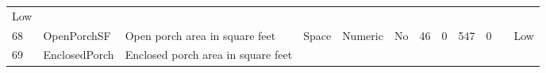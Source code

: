 \documentclass[11pt]{article}
\begin{document}
\begin{longtable}[]{@{}llllllllllll@{}}
\begin{minipage}[t]{0.04\columnwidth}
Low\strut
\end{minipage}\tabularnewline
\begin{minipage}[t]{0.04\columnwidth}\raggedright\strut
68\strut
\end{minipage} & \begin{minipage}[t]{0.04\columnwidth}\raggedright\strut
OpenPorchSF\strut
\end{minipage} & \begin{minipage}[t]{0.04\columnwidth}\raggedright\strut
Open porch area in square feet\strut
\end{minipage} & \begin{minipage}[t]{0.04\columnwidth}\raggedright\strut
Space\strut
\end{minipage} & \begin{minipage}[t]{0.04\columnwidth}\raggedright\strut
Numeric\strut
\end{minipage} & \begin{minipage}[t]{0.04\columnwidth}\raggedright\strut
No\strut
\end{minipage} & \begin{minipage}[t]{0.04\columnwidth}\raggedright\strut
46\strut
\end{minipage} & \begin{minipage}[t]{0.04\columnwidth}\raggedright\strut
0\strut
\end{minipage} & \begin{minipage}[t]{0.04\columnwidth}\raggedright\strut
547\strut
\end{minipage} & \begin{minipage}[t]{0.04\columnwidth}\raggedright\strut
0\strut
\end{minipage} & \begin{minipage}[t]{0.04\columnwidth}\raggedright\strut
\strut
\end{minipage} & \begin{minipage}[t]{0.04\columnwidth}\raggedright\strut
Low\strut
\end{minipage}\tabularnewline
\begin{minipage}[t]{0.04\columnwidth}\raggedright\strut
69\strut
\end{minipage} & \begin{minipage}[t]{0.04\columnwidth}\raggedright\strut
EnclosedPorch\strut
\end{minipage} & \begin{minipage}[t]{0.04\columnwidth}\raggedright\strut
Enclosed porch area in square feet\strut
\end{minipage} & \begin{minipage}[t]{0.04\columnwidth}\raggedright\strut

\end{minipage}
\end{longtable}
\end{document}
